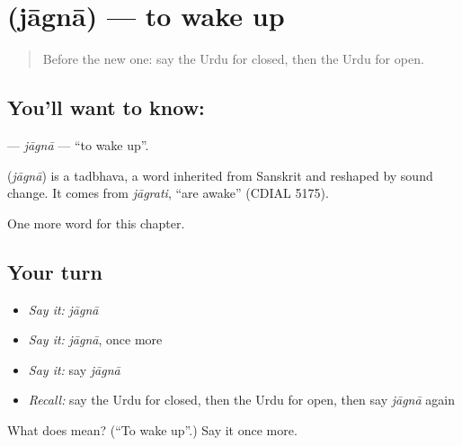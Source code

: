 \section[\texorpdfstring{\ur{جاگنا} (jāgnā)}{جاگنا (jāgnā)}]{ (jāgnā) — to wake up}

\label{lesson:UR-C137-jagna}



\begin{quote}
Before the new one: say the Urdu for closed, then the Urdu for open.
\end{quote}

\subsection*{You'll want to know: }
\textbf{} — \emph{jāgnā} — \textquotedblleft{}to wake up\textquotedblright{}.

\begin{cousinweb}
\textbf{} (\emph{jāgnā}) is a tadbhava, a word inherited from Sanskrit and reshaped by sound change. It comes from \emph{jāgrati}, \textquotedblleft{}are awake\textquotedblright{} (CDIAL 5175).
\end{cousinweb}

\begin{grammarlens}[title={What you've built}]
One more word for this chapter.
\end{grammarlens}

\subsection*{Your turn}
\begin{itemize}
\raggedright
  \item \emph{Say it:} \emph{jāgnā}
  \item \emph{Say it:} \emph{jāgnā}, once more
  \item \emph{Say it:} say \emph{jāgnā}
  \item \emph{Recall:} say the Urdu for closed, then the Urdu for open, then say \emph{jāgnā} again
\end{itemize}

\begin{tcolorbox}[breakable,colback=teal!4,colframe=teal!35!black,title={Before you move on}]
What does  mean? (\textquotedblleft{}To wake up\textquotedblright{}.) Say it once more.
\end{tcolorbox}
